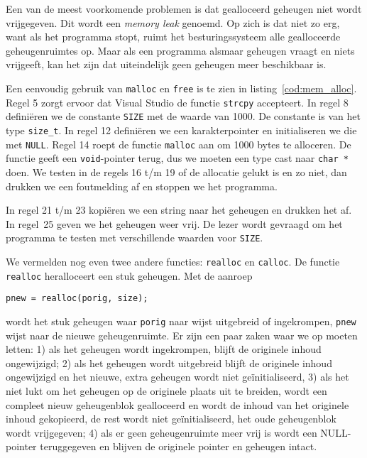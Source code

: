 Een van de meest voorkomende problemen is dat gealloceerd geheugen niet wordt vrijgegeven. Dit wordt een \textsl{memory leak} genoemd. Op zich is dat niet zo erg, want als het programma stopt, ruimt het besturingssysteem alle gealloceerde geheugenruimtes op. Maar als een programma alsmaar geheugen vraagt en niets vrijgeeft, kan het zijn dat uiteindelijk geen geheugen meer beschikbaar is.

Een eenvoudig gebruik van \texttt{malloc} en \texttt{free} is te zien in listing~\ref{cod:mem_alloc}. Regel 5 zorgt ervoor dat Visual Studio de functie \texttt{strcpy} accepteert. In regel 8 definiëren we de constante \texttt{SIZE} met de waarde van 1000. De constante is van het type \texttt{size\_t}. In regel 12 definiëren we een karakterpointer en initialiseren we die met \texttt{NULL}. Regel 14 roept de functie \texttt{malloc} aan om 1000 bytes te alloceren. De functie geeft een \texttt{void}-pointer terug, dus we moeten een type cast naar \texttt{char *} doen. We testen in de regels 16 t/m 19 of de allocatie gelukt is en zo niet, dan drukken we een foutmelding af en stoppen we het programma.


In regel 21 t/m 23 kopiëren we een string naar het geheugen en drukken het af. In regel~25 geven we het geheugen weer vrij. De lezer wordt gevraagd om het programma te testen met verschillende waarden voor \texttt{SIZE}.

We vermelden nog even twee andere functies: \texttt{realloc} en \texttt{calloc}. De functie \texttt{realloc} heralloceert een stuk geheugen. Met de aanroep

\hspace*{1em}\texttt{pnew = realloc(porig, size);}

wordt het stuk geheugen waar \texttt{porig} naar wijst uitgebreid of ingekrompen, \texttt{pnew} wijst naar de nieuwe geheugenruimte. Er zijn een paar zaken waar we op moeten letten: 1) als het geheugen wordt ingekrompen, blijft de originele inhoud ongewijzigd; 2) als het geheugen wordt uitgebreid blijft de originele inhoud ongewijzigd en het nieuwe, extra geheugen wordt niet geïnitialiseerd, 3) als het niet lukt om het geheugen op de originele plaats uit te breiden, wordt een compleet nieuw geheugenblok gealloceerd en wordt de inhoud van het originele inhoud gekopieerd, de rest wordt niet geïnitialiseerd, het oude geheugenblok wordt vrijgegeven; 4) als er geen geheugenruimte meer vrij is wordt een NULL-pointer teruggegeven en blijven de originele pointer en geheugen intact.

